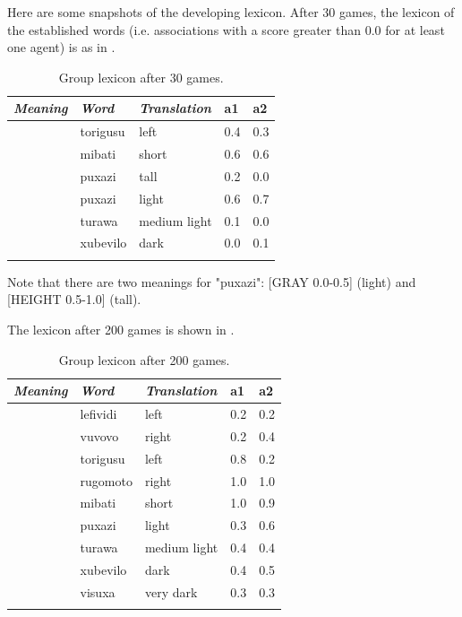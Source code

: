 Here are some snapshots of the developing lexicon. 
After 30 games, the lexicon of the established
words (i.e. associations with a score greater 
than 0.0 for at least one agent) is as in . 
\begin{table}
\begin{center}
\begin{tabular}{ l  l  l  l  l }
\lsptoprule
{\it Meaning}&{\it Word}&{\it Translation} & {\bf a1}&{\bf a2} \\ \midrule
[VPOS 0.0-0.5] &torigusu&left&0.4&0.3\\ \midrule
[HEIGHT 0.0-0.5]&mibati&short &0.6&0.6\\ \midrule
[HEIGHT 0.5-1.0]&puxazi&tall &0.2&0.0\\ \midrule
[GRAY 0.0-0.5]& puxazi&light &0.6&0.7\\ \midrule
[GRAY 0.25-0.5]&turawa&medium light&0.1&0.0\\ \midrule
[GRAY 0.5-1.0]& xubevilo&dark &0.0&0.1\\ \midrule
\lspbottomrule
\end{tabular}
\caption{\label{tab:after30} Group lexicon after 30 games.}
\end{center}
\end{table}
Note that there are two meanings for "puxazi": 
[GRAY 0.0-0.5] (light) and [HEIGHT 0.5-1.0] (tall). 

The lexicon after 200 games is shown in . 
\begin{table}
\begin{center}
\begin{tabular}{ l  l  l  l  l }
\lsptoprule
{\it Meaning}&{\it Word}&{\it Translation} & {\bf a1}&{\bf a2} \\ \midrule
[HPOS 0.0-0.5] &lefividi&left&0.2&0.2\\ \midrule
[HPOS 0.5-1.0] &vuvovo&right&0.2&0.4\\ \midrule
[VPOS 0.0-0.5] &torigusu&left&0.8&0.2\\ \midrule
[VPOS 0.5-1.0] &rugomoto&right&1.0&1.0\\ \midrule
[HEIGHT 0.0-0.5]&mibati&short &1.0&0.9\\ \midrule
[GRAY 0.0-0.5]& puxazi&light &0.3&0.6\\ \midrule
[GRAY 0.25-0.5]&turawa&medium light&0.4&0.4\\ \midrule
[GRAY 0.5-1.0]& xubevilo&dark &0.4&0.5\\ \midrule
[GRAY 0.5-0.75]& visuxa&very dark &0.3&0.3\\ \midrule
\lspbottomrule
\end{tabular}
\caption{\label{tab:after200} Group lexicon after 200 games.}
\end{center}
\end{table}

